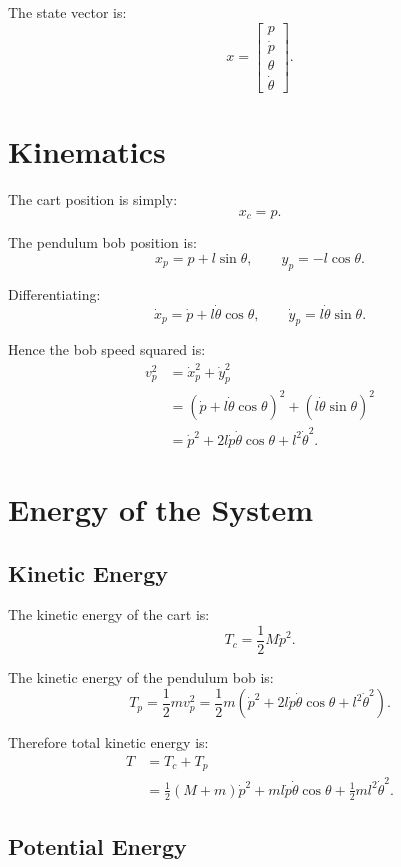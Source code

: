 \documentclass[11pt,a4paper]{article}
\begin{document}
The state vector is:
\[
x = \begin{bmatrix}
p \\ \dot p \\ \theta \\ \dot \theta
\end{bmatrix}.
\]

\section{Kinematics}

The cart position is simply:
\[
x_c = p.
\]

The pendulum bob position is:
\[
x_p = p + l\sin\theta,
\qquad
y_p = -l\cos\theta.
\]

Differentiating:
\[
\dot x_p = \dot p + l\dot\theta\cos\theta,
\qquad
\dot y_p = l\dot\theta\sin\theta.
\]

Hence the bob speed squared is:
\begin{align*}
v_p^2
&= \dot x_p^2 + \dot y_p^2 \\
&= \left(\dot p + l\dot\theta\cos\theta\right)^2
   + \left(l\dot\theta\sin\theta\right)^2 \\
&= \dot p^2 + 2l\dot p\dot\theta\cos\theta + l^2\dot\theta^2.
\end{align*}

\section{Energy of the System}

\subsection{Kinetic Energy}

The kinetic energy of the cart is:
\[
T_c = \frac{1}{2}M\dot p^2.
\]

The kinetic energy of the pendulum bob is:
\[
T_p = \frac{1}{2}m v_p^2
= \frac{1}{2}m\left(\dot p^2 + 2l\dot p\dot\theta\cos\theta + l^2\dot\theta^2\right).
\]

Therefore total kinetic energy is:
\begin{align*}
T &= T_c + T_p \\
&= \frac{1}{2}(M+m)\dot p^2 + ml\dot p\dot\theta\cos\theta + \frac{1}{2}ml^2\dot\theta^2.
\end{align*}

\subsection{Potential Energy}
\end{document}
